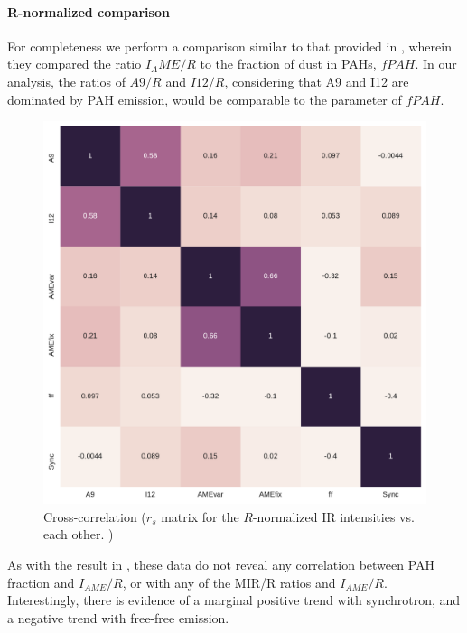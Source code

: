         \paragraph{R-normalized comparison}
            For completeness we perform a comparison similar to that provided in \cite{hensley16}, wherein they compared the ratio $I_AME/R$ to the fraction of dust in PAHs, $fPAH$. In our analysis, the ratios of $A9/R$ and $I12/R$, considering that A9 and I12 are dominated by PAH emission, would be comparable to the \cite{hensley16} parameter of $fPAH$.
                \begin{figure}
                    \includegraphics[width=\textwidth/2]{../Plots/ch_allsky/all_bands_corr_matrix_wAME_spearmanR_norm_masked_hens.pdf}
                    \centering
                    \caption{Cross-correlation ($r_{s}$ matrix for the $R$-normalized IR intensities vs. each other. )}
                    \label{fig:all_bands_corr_matrix_wAME_spearmanR_norm_masked_hens}
                \end{figure}
            As with the result in \cite{hensley16}, these data do not reveal any correlation between PAH fraction and $I_{AME}/R$, or with any of the MIR/R ratios and $I_{AME}/R$. Interestingly, there is evidence of a marginal positive trend with synchrotron, and a negative trend with free-free emission.

